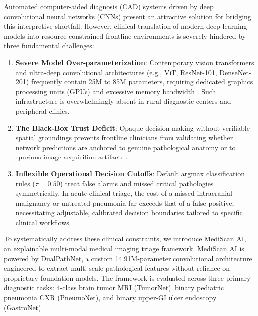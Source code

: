 \documentclass[conference]{IEEEtran}
\begin{document}
Automated computer-aided diagnosis (CAD) systems driven by deep convolutional neural networks (CNNs) present an attractive solution for bridging this interpretive shortfall. However, clinical translation of modern deep learning models into resource-constrained frontline environments is severely hindered by three fundamental challenges:
\begin{enumerate}
    \item \textbf{Severe Model Over-parameterization}: Contemporary vision transformers and ultra-deep convolutional architectures (e.g., ViT, ResNet-101, DenseNet-201) frequently contain 25M to 85M parameters, requiring dedicated graphics processing units (GPUs) and excessive memory bandwidth \cite{he2016deep, kelly2019key}. Such infrastructure is overwhelmingly absent in rural diagnostic centers and peripheral clinics.
    \item \textbf{The Black-Box Trust Deficit}: Opaque decision-making without verifiable spatial groundings prevents frontline clinicians from validating whether network predictions are anchored to genuine pathological anatomy or to spurious image acquisition artifacts \cite{olimboyev2022gastro, selvaraju2017gradcam}.
    \item \textbf{Inflexible Operational Decision Cutoffs}: Default argmax classification rules ($\tau = 0.50$) treat false alarms and missed critical pathologies symmetrically. In acute clinical triage, the cost of a missed intracranial malignancy or untreated pneumonia far exceeds that of a false positive, necessitating adjustable, calibrated decision boundaries tailored to specific clinical workflows.
\end{enumerate}

To systematically address these clinical constraints, we introduce MediScan AI, an explainable multi-modal medical imaging triage framework. MediScan AI is powered by DualPathNet, a custom 14.91M-parameter convolutional architecture engineered to extract multi-scale pathological features without reliance on proprietary foundation models. The framework is evaluated across three primary diagnostic tasks: 4-class brain tumor MRI (TumorNet), binary pediatric pneumonia CXR (PneumoNet), and binary upper-GI ulcer endoscopy (GastroNet).
\end{document}
